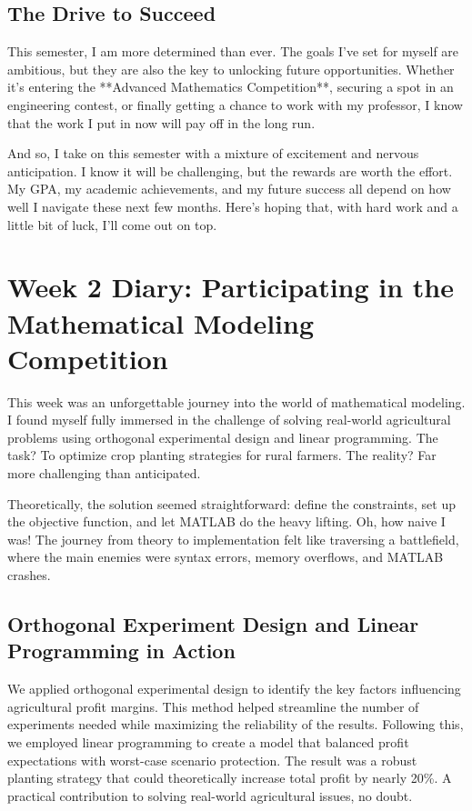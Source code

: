 \documentclass[a4paper]{article} 	%
\begin{document}
\subsection*{The Drive to Succeed}

This semester, I am more determined than ever. The goals I’ve set for myself are ambitious, but they are also the key to unlocking future opportunities. Whether it’s entering the **Advanced Mathematics Competition**, securing a spot in an engineering contest, or finally getting a chance to work with my professor, I know that the work I put in now will pay off in the long run.

And so, I take on this semester with a mixture of excitement and nervous anticipation. I know it will be challenging, but the rewards are worth the effort. My GPA, my academic achievements, and my future success all depend on how well I navigate these next few months. Here's hoping that, with hard work and a little bit of luck, I’ll come out on top.

\section{Week 2 Diary: Participating in the Mathematical Modeling Competition}

This week was an unforgettable journey into the world of mathematical modeling. I found myself fully immersed in the challenge of solving real-world agricultural problems using orthogonal experimental design and linear programming. The task? To optimize crop planting strategies for rural farmers. The reality? Far more challenging than anticipated. 

Theoretically, the solution seemed straightforward: define the constraints, set up the objective function, and let MATLAB do the heavy lifting. Oh, how naive I was! The journey from theory to implementation felt like traversing a battlefield, where the main enemies were syntax errors, memory overflows, and MATLAB crashes.

\subsection*{Orthogonal Experiment Design and Linear Programming in Action}

We applied orthogonal experimental design to identify the key factors influencing agricultural profit margins. This method helped streamline the number of experiments needed while maximizing the reliability of the results. Following this, we employed linear programming to create a model that balanced profit expectations with worst-case scenario protection. The result was a robust planting strategy that could theoretically increase total profit by nearly 20\%. A practical contribution to solving real-world agricultural issues, no doubt.
\end{document}
